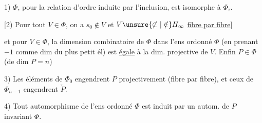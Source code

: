 1) $\Phi$, pour la relation d'ordre induite par l'inclusion, est isomorphe à $\Phi_\tau$.

[2)  Pour tout $V\in\Phi$, on a $s_0\notin V$ et $V\unsure{\not\subset|\notin}H_\infty$ \uline{fibre par fibre}]

et pour $V\in\Phi$, la dimension combinatoire de $\Phi$ dans l'ens ordonné $\Phi$ (en prenant $-1$ comme dim du plus petit él) est \uline{égale} à la dim. projective de $V$.  Enfin $P\in\Phi$ (de dim $P=n$)

3)  Les éléments de $\Phi_0$ engendrent $P$ projectivement (fibre par fibre), et ceux de $\Phi_{n-1}$ engendrent $\check P$.


4) Tout automorphisme de l'ens ordonné $\Phi$ est induit par un autom. de $P$ invariant $\Phi$.
